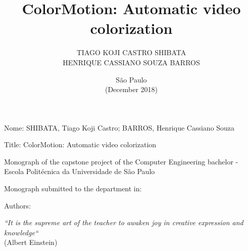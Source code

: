\documentclass[12pt,openright,oneside,a4paper,english, brazilian]{abntex2}
\author{TIAGO KOJI CASTRO SHIBATA\\
HENRIQUE CASSIANO SOUZA BARROS}
\title{ColorMotion: Automatic video colorization}
\date{São Paulo\\(December 2018)}
\begin{document}
\begin{otherlanguage}{english}

\imprimircapa
\imprimirfalsafolhaderosto
\imprimirfolhaderosto

\begin{folhadeaprovacao}
\noindent
Nome: SHIBATA, Tiago Koji Castro; BARROS, Henrique Cassiano Souza

\noindent
Title: ColorMotion: Automatic video colorization

\vspace{1cm}
\hspace{.2\textwidth} %
\begin{minipage}{.75\textwidth}
    \begin{sloppypar}
        Monograph of the capstone project of the Computer Engineering bachelor - Escola Politécnica da Universidade de São Paulo \\[0.3cm]
    \end{sloppypar}
\end{minipage}

\noindent
Monograph submitted to the department in: \\

\begin{center}
Authors:
\end{center}

\hspace{5cm}
\hspace{5cm}

\end{folhadeaprovacao}



\begin{epigrafe}
\begin{flushright}
\vspace*{\fill}

\textit{``It is the supreme art of the teacher to awaken joy in creative expression and knowledge``}\\
(Albert Einstein)
\par\end{flushright}\end{epigrafe} %


\end{otherlanguage}
\end{document}
